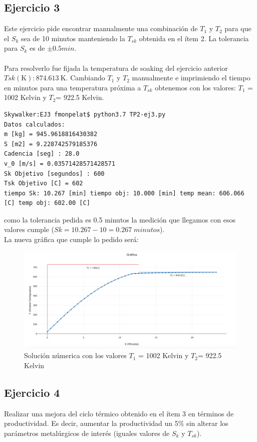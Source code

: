 \documentclass[10pt,a4paper]{article}
\begin{document}
\subsection{Ejercicio 3}
Este ejercicio pide encontrar manualmente una combinación de $T_{1}$ y $T_{2}$ para que el $S_{k}$ sea de 10 minutos
manteniendo la $T_{sk}$ obtenida en el ítem 2. La tolerancia para $S_{k}$ es de $\pm0.5min$.
\\
\\
Para resolverlo fue fijada la temperatura de soaking del ejercicio anterior $Tsk(\si{\kelvin}):\SI{874.613}{\kelvin}$.
Cambiando $T_{1}$ y $T_{2}$ manualmente e imprimiendo el tiempo en minutos para una temperatura próxima a $T_{sk}$ obtenemos con los valores:
$T_{1}$ = 1002 Kelvin y $T_{2}$= 922.5 Kelvin.
\begin{verbatim}
Skywalker:EJ3 fmonpelat$ python3.7 TP2-ej3.py 
Datos calculados: 
m [kg] = 945.9618816430382
S [m2] = 9.228742579185376
Cadencia [seg] : 28.0
v_0 [m/s] = 0.03571428571428571
Sk Objetivo [segundos] : 600
Tsk Objetivo [C] = 602
tiempo Sk: 10.267 [min] tiempo obj: 10.000 [min] temp mean: 606.066 [C] temp obj: 602.00 [C]
\end{verbatim}
como la tolerancia pedida es 0.5 minutos la medición que llegamos con esos valores cumple ($Sk=10.267-10=0.267\;minutos$).\\
La nueva gráfica que cumple lo pedido será:
\begin{figure}[H]
\centering
\includegraphics[width=18cm]{Grafica-soaking_ej3.png}
\caption{Solución númerica con los valores $T_{1}$ = 1002 Kelvin y $T_{2}$= 922.5 Kelvin}
\end{figure}


\subsection{Ejercicio 4}
Realizar una mejora del ciclo térmico obtenido en el ítem 3 en términos de productividad. Es decir, aumentar la productividad un 5\% sin alterar los parámetros metalúrgicos de interés (iguales valores de $S_{k}$ y $T_{sk}$).
\end{document}
